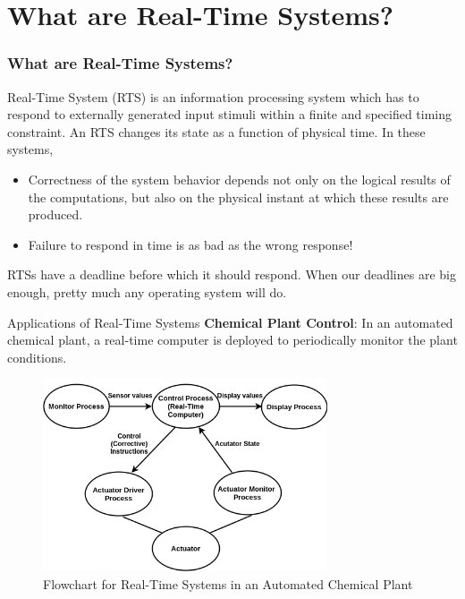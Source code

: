 \documentclass{beamer}
\begin{document}
\section{What are Real-Time Systems?}
\begin{frame}
\frametitle{What are Real-Time Systems?}
Real-Time System (RTS) is an information processing system which has to respond to externally generated input stimuli within a finite and specified timing constraint. An RTS changes its state as a function of physical time. In these systems,
\begin{itemize}
    \item Correctness of the system behavior depends not only on the logical results of the computations, but also on the physical instant at which these results are produced.
    \item Failure to respond in time is as bad as the wrong response!
\end{itemize}
\vspace{0.4cm}
RTSs have a deadline before which it should respond. When our deadlines are big enough, pretty much any operating system will do.
\end{frame}
 

\begin{frame}{Applications of Real-Time Systems}
\textbf{Chemical Plant Control}: In an automated chemical plant, a real-time computer is deployed to periodically monitor the plant conditions. 
\begin{figure}[h]
    \centering
    \includegraphics[width=0.75\textwidth]{images/chem.png}
    \caption{Flowchart for Real-Time Systems in an Automated Chemical Plant}
\end{figure}
\end{frame}
\end{document}
